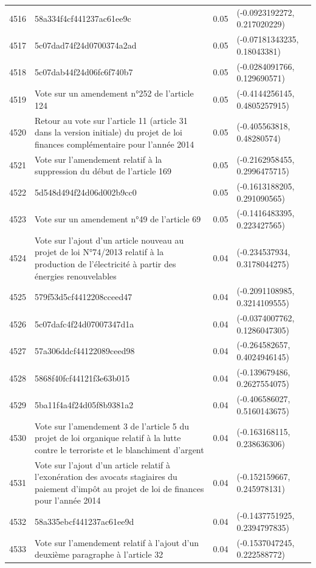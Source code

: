 \begin{table}[ht]
\begin{tabular}{rlrl}
  4516 & 58a334f4cf441237ac61ee9c & 0.05 & (-0.0923192272, 0.217020229) \\ 
  4517 & 5c07dad74f24d0700374a2ad & 0.05 & (-0.07181343235, 0.18043381) \\ 
  4518 & 5c07dab44f24d06fc6f740b7 & 0.05 & (-0.0284091766, 0.129690571) \\ 
  4519 & Vote sur un amendement n°252 de l'article 124 & 0.05 & (-0.4144256145, 0.4805257915) \\ 
  4520 & Retour au vote sur l'article 11 (article 31 dans la version initiale) du projet de loi finances complémentaire pour l'année 2014 & 0.05 & (-0.405563818, 0.48280574) \\ 
  4521 & Vote sur l'amendement relatif à la suppression du début de l'article 169 & 0.05 & (-0.2162958455, 0.2996475715) \\ 
  4522 & 5d548d494f24d06d002b9cc0 & 0.05 & (-0.1613188205, 0.291090565) \\ 
  4523 & Vote sur un amendement n°49 de l'article 69 & 0.05 & (-0.1416483395, 0.223427565) \\ 
  4524 & Vote sur l'ajout d'un article nouveau au projet de loi N°74/2013 relatif à la production de l'électricité à partir des énergies renouvelables & 0.04 & (-0.234537934, 0.3178044275) \\ 
  4525 & 579f53d5cf4412208cceed47 & 0.04 & (-0.2091108985, 0.3214109555) \\ 
  4526 & 5c07dafc4f24d07007347d1a & 0.04 & (-0.0374007762, 0.1286047305) \\ 
  4527 & 57a306ddcf44122089ceed98 & 0.04 & (-0.264582657, 0.4024946145) \\ 
  4528 & 5868f40fcf44121f3e63b015 & 0.04 & (-0.139679486, 0.2627554075) \\ 
  4529 & 5ba11f4a4f24d05f8b9381a2 & 0.04 & (-0.406586027, 0.5160143675) \\ 
  4530 & Vote sur l'amendement 3 de l'article 5 du projet de loi organique relatif à la lutte contre le terroriste et le blanchiment d'argent & 0.04 & (-0.163168115, 0.238636306) \\ 
  4531 & Vote sur l'ajout d'un article relatif à l'exonération des avocats stagiaires du paiement d'impôt au projet de loi de finances pour l'année 2014 & 0.04 & (-0.152159667, 0.245978131) \\ 
  4532 & 58a335ebcf441237ac61ee9d & 0.04 & (-0.1437751925, 0.2394797835) \\ 
  4533 & Vote sur l'amendement relatif à l'ajout d'un deuxième paragraphe à l'article 32 & 0.04 & (-0.1537047245, 0.222588772) \\ 

\end{tabular}
\end{table}

